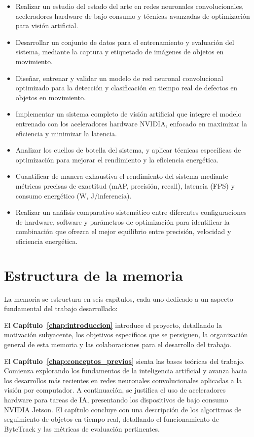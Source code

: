 \documentclass[11pt,spanish,listoffigures,listoftables]{tfgetsinf}
\begin{document}
\begin{itemize}
   \item Realizar un estudio del estado del arte en redes neuronales convolucionales, aceleradores hardware de bajo consumo y técnicas avanzadas de optimización para visión artificial.
   \item Desarrollar un conjunto de datos para el entrenamiento y evaluación del sistema, mediante la captura y etiquetado de imágenes de objetos en movimiento.
   \item Diseñar, entrenar y validar un modelo de red neuronal convolucional optimizado para la detección y clasificación en tiempo real de defectos en objetos en movimiento.
   \item Implementar un sistema completo de visión artificial que integre el modelo entrenado con los aceleradores hardware NVIDIA, enfocado en maximizar la eficiencia y minimizar la latencia.
   \item Analizar los cuellos de botella del sistema, y aplicar técnicas específicas de optimización para mejorar el rendimiento y la eficiencia energética.
   \item Cuantificar de manera exhaustiva el rendimiento del sistema mediante métricas precisas de exactitud (mAP, precisión, recall), latencia (FPS) y consumo energético (W, J/inferencia).
   \item Realizar un análisis comparativo sistemático entre diferentes configuraciones de hardware, software y parámetros de optimización para identificar la combinación que ofrezca el mejor equilibrio entre precisión, velocidad y eficiencia energética.
\end{itemize}

\section{Estructura de la memoria}  \label{sec:estructura_memoria}

La memoria se estructura en seis capítulos, cada uno dedicado a un aspecto fundamental del trabajo desarrollado:

El \textbf{Capítulo~\ref{chap:introduccion}} introduce el proyecto, detallando la motivación subyacente, los objetivos específicos que se persiguen, la organización general de esta memoria y las colaboraciones para el desarrollo del trabajo.

El \textbf{Capítulo~\ref{chap:conceptos_previos}} sienta las bases teóricas del trabajo. Comienza explorando los fundamentos de la inteligencia artificial y avanza hacia los desarrollos más recientes en redes neuronales convolucionales aplicadas a la visión por computador. A continuación, se justifica el uso de aceleradores hardware para tareas de IA, presentando los dispositivos de bajo consumo NVIDIA Jetson. El capítulo concluye con una descripción de los algoritmos de seguimiento de objetos en tiempo real, detallando el funcionamiento de ByteTrack y las métricas de evaluación pertinentes.
\end{document}
